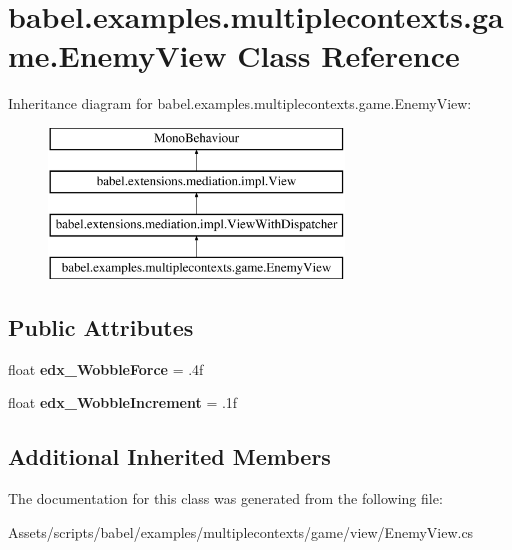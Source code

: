 \hypertarget{classbabel_1_1examples_1_1multiplecontexts_1_1game_1_1_enemy_view}{\section{babel.\-examples.\-multiplecontexts.\-game.\-Enemy\-View Class Reference}
\label{classbabel_1_1examples_1_1multiplecontexts_1_1game_1_1_enemy_view}
}
Inheritance diagram for babel.\-examples.\-multiplecontexts.\-game.\-Enemy\-View\-:\begin{figure}[H]
\begin{center}
\leavevmode
\includegraphics[height=4.000000cm]{classbabel_1_1examples_1_1multiplecontexts_1_1game_1_1_enemy_view}
\end{center}
\end{figure}
\subsection*{Public Attributes}
\begin{DoxyCompactItemize}
\item 
\hypertarget{classbabel_1_1examples_1_1multiplecontexts_1_1game_1_1_enemy_view_aba952bff051a306f8eb302b3747f5021}{float {\bfseries edx\-\_\-\-Wobble\-Force} = .\-4f}\label{classbabel_1_1examples_1_1multiplecontexts_1_1game_1_1_enemy_view_aba952bff051a306f8eb302b3747f5021}

\item 
\hypertarget{classbabel_1_1examples_1_1multiplecontexts_1_1game_1_1_enemy_view_a0d07f4194f062da28c021eaee7aeeac6}{float {\bfseries edx\-\_\-\-Wobble\-Increment} = .\-1f}\label{classbabel_1_1examples_1_1multiplecontexts_1_1game_1_1_enemy_view_a0d07f4194f062da28c021eaee7aeeac6}

\end{DoxyCompactItemize}
\subsection*{Additional Inherited Members}


The documentation for this class was generated from the following file\-:\begin{DoxyCompactItemize}
\item 
Assets/scripts/babel/examples/multiplecontexts/game/view/Enemy\-View.\-cs\end{DoxyCompactItemize}
